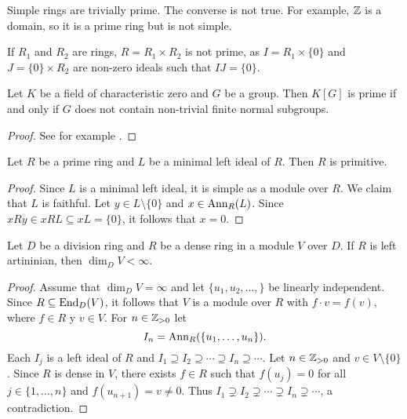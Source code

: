 Simple rings are trivially prime. The converse is not true. For example,
$\mathbb{Z}$ is a domain, so it is a prime ring but is not simple.

\begin{example}
	If $R_1$ and $R_2$ are rings, $R=R_1\times R_2$ is not prime, as 
	$I=R_1\times\{0\}$ and $J=\{0\}\times R_2$ are non-zero ideals such that $IJ=\{0\}$.
\end{example}

\begin{theorem}[Connel]
\label{thm:Connel}
    Let $K$ be a field of characteristic zero and
    $G$ be a group. Then $K[G]$ is prime
    if and only if $G$ does not contain 
    non-trivial finite normal subgroups. 
\end{theorem}

\begin{proof}
    See for example \cite[Theorem 2.10 of Chapter 4]{MR798076}.
\end{proof}

\begin{lemma}
	\label{lem:primoizqmin=>prim}
	Let $R$ be a prime ring and $L$ be a minimal left ideal of $R$.
	Then $R$ is primitive. 
\end{lemma}

\begin{proof}
	Since $L$ is a minimal left ideal, it is simple as a module over $R$. 
	We claim that $L$ is faithful. Let $y\in L\setminus\{0\}$ and
	$x\in\operatorname{Ann}_R(L)$. Since $xRy\in xRL\subseteq xL=\{0\}$, it follows that 
	$x=0$.
\end{proof}

\begin{lemma}
	\label{lem:denso_artiniano}
	Let $D$ be a division ring and $R$ be a dense ring in a module $V$ over $D$. 
	If $R$ is left artininian, then $\dim_DV<\infty$.
\end{lemma}

\begin{proof}
	Assume that $\dim_DV=\infty$ and let $\{u_1,u_2,\dots,\}$ be linearly independent. 
	Since $R\subseteq\operatorname{End}_D(V)$, it follows that 
	$V$ is a module over $R$ with $f\cdot v=f(v)$, where $f\in R$ y $v\in V$. 
	For $n\in\mathbb{Z}_{>0}$ let 
	\[
		I_n=\operatorname{Ann}_R(\{u_1,\dots,u_n\}).
	\]
	Each $I_j$ is a left ideal of $R$ and $I_1\supseteq
	I_2\supseteq\cdots\supseteq I_n\supseteq\cdots$. Let 
	$n\in\mathbb{Z}_{>0}$ and $v\in V\setminus\{0\}$. Since $R$ is dense
	in $V$, there exists $f\in R$ such that $f(u_j)=0$ for all $j\in\{1,\dots,n\}$ and 
	$f(u_{n+1})=v\ne0$. Thus $I_1\supsetneq I_2\supsetneq\cdots\supsetneq
	I_n\supsetneq\cdots$, a contradiction.
\end{proof}

